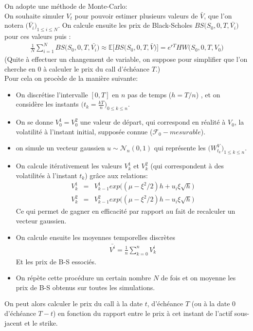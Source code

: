 \documentclass{report}
\begin{document}
On adopte une méthode de Monte-Carlo:\\
On souhaite simuler $V_t$ pour pouvoir estimer plusieurs valeurs de $\bar{V}$, que l'on notera $\big(\bar{V_i}\big)_{1\leq i\leq N}$. On calcule ensuite les prix de Black-Scholes $BS\big(S_0, 0, T, \bar{V_i}\big)$ pour ces valeurs puis :
\begin{eqnarray*}
\frac{1}{N}\sum\limits_{i=1}^N{BS\big(S_0, 0, T, \bar{V_i}\big)} \approx \mathbb{E}\Big[BS\big(S_0, 0, T, \bar{V}\big)\Big] = e^{rT}HW\big(S_0, 0, T, V_0\big)
\end{eqnarray*}
(Quite à effectuer un changement de variable, on suppose pour simplifier que l'on cherche en $0$ à calculer le prix du call d'échéance $T$.)\\
Pour cela on procède de la manière suivante:\\
\begin{itemize}
	\item On discrétise l'intervalle $[0, T]$ en $n$ pas de temps ($h = T/n$) , et on considère les instants $\big(t_k = \frac{kT}{n}\big)_{0\leq k\leq n}$.
	\item On se donne $V^1_0 = V^2_0$ une valeur de départ, qui correspond en réalité à $V_0$, la volatilité à l'instant initial, supposée connue ($\mathcal{F}_0-mesurable$).
	\item on simule un vecteur gaussien $u \sim \mathcal{N}_n(0, 1)$ qui représente les $\big(W^V_{t_k}\big)_{1\leq k\leq n}$.
	\item On calcule itérativement les valeurs $V^1_k$ et $V^2_k$ (qui correspondent à des volatilités à l'instant $t_k$) grâce aux relations:
	\begin{eqnarray*}
	V^1_k &=& V^1_{k-1}exp\Big((\mu-\xi^2/2)h + u_i\xi \sqrt{h}\Big)\\
	V^2_k &=& V^2_{k-1}exp\Big((\mu-\xi^2/2)h - u_i\xi \sqrt{h}\Big)
	\end{eqnarray*}
	Ce qui permet de gagner en efficacité par rapport au fait de recalculer un vecteur gaussien.
	\item On calcule ensuite les moyennes temporelles discrètes
	\begin{eqnarray*}
	\bar{V^i} = \frac{1}{n}\sum\limits_{k=0}^n{V^i_k}
	\end{eqnarray*}
	Et les prix de B-S essociés.
	\item On répète cette procédure un certain nombre $N$ de fois et on moyenne les prix de B-S obtenus sur toutes les simulations. 
\end{itemize}
On peut alors calculer le prix du call à la date $t$, d'échéance $T$ (ou à la date $0$ d'échéance $T-t$) en fonction du rapport entre le prix à cet instant de l'actif sous-jacent et le strike.
\end{document}
